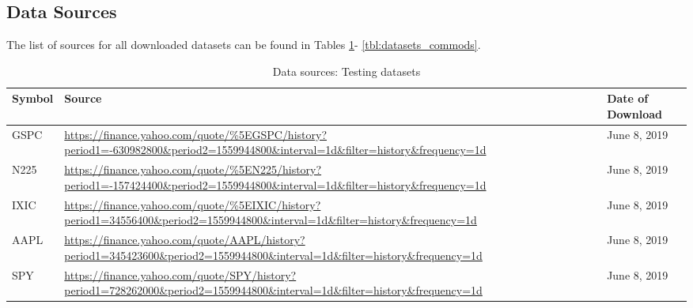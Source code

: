 \documentclass[12pt, a4paper]{article}
\begin{document}
\subsection{Data Sources}

The list of sources for all downloaded datasets can be found in Tables \ref{tbl:datasets_main}- \ref{tbl:datasets_commods}.

\begin{table}[H]
    \centering
        \begin{tabular}{p{3.0cm} p{10.0cm}l}
        \hline
        \textbf{Symbol}                                                             & \textbf{Source}                                                                                                                                              & \textbf{Date of Download} \\ \hline
       GSPC                                                                        & \url{https://finance.yahoo.com/quote/\%5EGSPC/history?period1=-630982800\&period2=1559944800\&interval=1d\&filter=history\&frequency=1d}    & June 8, 2019              \\
        N225                                                                        & \url{https://finance.yahoo.com/quote/\%5EN225/history?period1=-157424400\&period2=1559944800\&interval=1d\&filter=history\&frequency=1d}    & June 8, 2019              \\
        IXIC                                                                        & \url{https://finance.yahoo.com/quote/\%5EIXIC/history?period1=34556400\&period2=1559944800\&interval=1d\&filter=history\&frequency=1d}      & June 8, 2019              \\
        AAPL                                                                        & \url{https://finance.yahoo.com/quote/AAPL/history?period1=345423600\&period2=1559944800\&interval=1d\&filter=history\&frequency=1d}         & June 8, 2019              \\
        SPY                                                                         & \url{https://finance.yahoo.com/quote/SPY/history?period1=728262000\&period2=1559944800\&interval=1d\&filter=history\&frequency=1d}          & June 8, 2019              \\ \hline
        \end{tabular}
        \caption{Data sources: Testing datasets}
    \label{tbl:datasets_main}
\end{table}
\end{document}
